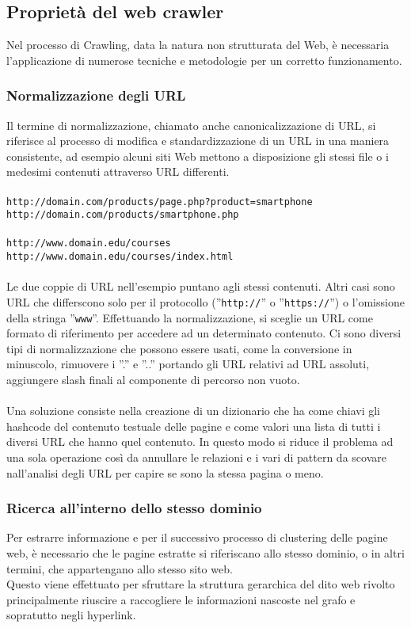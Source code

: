 \subsection{Proprietà del web crawler}
Nel processo di Crawling, data la natura non strutturata del Web, è necessaria l'applicazione di numerose tecniche e metodologie per un corretto funzionamento.

\subsubsection{Normalizzazione degli URL}
Il termine di normalizzazione, chiamato anche canonicalizzazione di URL, si riferisce al processo di modifica e standardizzazione di un URL in una maniera consistente, ad esempio alcuni siti Web mettono a disposizione gli stessi file o i medesimi contenuti attraverso URL differenti. 
\\\\
\texttt{http://domain.com/products/page.php?product=smartphone}
\\
\texttt{http://domain.com/products/smartphone.php}
\\\\
\texttt{http://www.domain.edu/courses}
\\
\texttt{http://www.domain.edu/courses/index.html}
\\\\
Le due coppie di URL nell’esempio puntano agli stessi contenuti. Altri casi sono URL che differscono solo per il protocollo (''\texttt{http://}'' o ''\texttt{https://}'') o l'omissione della stringa ''\texttt{www}''. Effettuando la normalizzazione, si sceglie un URL come formato di riferimento per accedere ad un determinato contenuto. Ci sono diversi tipi di normalizzazione che possono essere usati, come la conversione in minuscolo, rimuovere i ''.'' e ''..'' portando gli URL relativi ad URL assoluti, aggiungere slash finali al componente di percorso non vuoto.
\\\\
Una soluzione consiste nella creazione di un dizionario che ha come chiavi gli hashcode del contenuto testuale delle pagine e come valori una lista di tutti i diversi URL che hanno quel contenuto. In questo modo si riduce il problema ad una sola operazione così da annullare le relazioni e i vari di pattern da scovare nall'analisi degli URL per capire se sono la stessa pagina o meno. 

\subsubsection{Ricerca all'interno dello stesso dominio}
Per estrarre informazione e per il successivo processo di clustering delle pagine web, è necessario che le pagine estratte si riferiscano allo stesso dominio, o in altri termini, che appartengano allo stesso sito web.
\\
Questo viene effettuato per sfruttare la struttura gerarchica del dito web rivolto principalmente riuscire a  raccogliere le informazioni nascoste nel grafo e sopratutto negli hyperlink.

